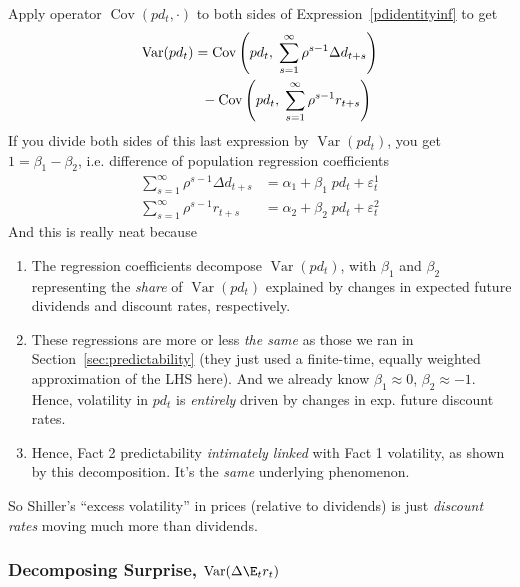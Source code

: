\documentclass[12pt]{article}
\theoremstyle{plain}
\theoremstyle{definition}
\theoremstyle{remark}
\newcommand{\Cov}{\operatorname{Cov}}
\newcommand{\Var}{\operatorname{Var}}
\begin{document}
\begin{multicols*}{2}
Apply operator $\Cov(pd_t,\cdot)$ to both sides of
Expression~\ref{pdidentityinf} to get
\begin{align}
  \Var(pd_t)
  &=
  \Cov\left(
    pd_t,\;
    \sum_{s=1}^\infty \rho^{s-1}\Delta d_{t+s}
  \right)
  \notag
  \\
  &\;\;
  -
  \Cov\left(
    pd_t,\;
    \sum_{s=1}^\infty \rho^{s-1}r_{t+s}
  \right)
  \notag
\end{align}
If you divide both sides of this last expression by $\Var(pd_t)$,
you get $1=\beta_{1}-\beta_{2}$, i.e. difference of population
regression coefficients
\begin{align*}
  \sum_{s=1}^\infty \rho^{s-1}\Delta d_{t+s}
  &= \alpha_{1} + \beta_{1}\; pd_t
  + \varepsilon^{1}_t
  \\
  \sum_{s=1}^\infty \rho^{s-1}r_{t+s}
  &= \alpha_{2} + \beta_{2}\; pd_t + \varepsilon^2_t
\end{align*}
And this is really neat because
\begin{enumerate}
  \item
    The regression coefficients decompose $\Var(pd_t)$, with
    $\beta_{1}$ and $\beta_2$ representing the \emph{share} of
    $\Var(pd_t)$ explained by changes in expected future dividends and
    discount rates, respectively.

  \item
    These regressions are more or less \emph{the same} as those we ran
    in Section~\ref{sec:predictability} (they just used a finite-time,
    equally weighted approximation of the LHS here).
    And we already know $\beta_{1}\approx 0$, $\beta_2\approx -1$.
    Hence, volatility in $pd_t$ is \emph{entirely} driven by changes in
    exp. future discount rates.

  \item
    Hence, Fact 2 predictability \emph{intimately linked} with Fact 1
    volatility, as shown by this decomposition.
    It's the \emph{same} underlying phenomenon.
\end{enumerate}
So Shiller's ``excess volatility'' in prices (relative to
dividends) is just \emph{discount rates} moving much more than
dividends.

\subsubsection{Decomposing Surprise, $\Var(\Delta \E_t r_t)$}
\label{sec:decompsur}


\end{multicols*}
\end{document}
